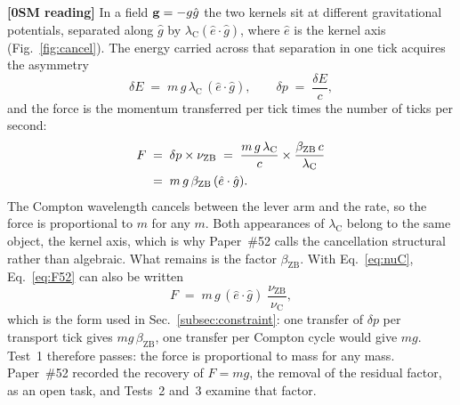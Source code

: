 \documentclass[%
 reprint, amsmath,amssymb, aps, prb, ]{revtex4-2}
\numberwithin{equation}{section}
\newcommand{\betaZB}{\beta_{\text{ZB}}}
\newcommand{\lambdaC}{\lambda_{\text{C}}}
\newcommand{\nuZB}{\nu_{\text{ZB}}}
\newcommand{\nuC}{\nu_{\text{C}}}
\begin{document}
\textbf{[0SM reading]} In a field $\vb{g} = -g\hat{g}$ the two kernels sit at different gravitational potentials, separated along $\hat{g}$ by $\lambdaC(\hat{e}\cdot\hat{g})$, where $\hat{e}$ is the kernel axis (Fig.~\ref{fig:cancel}). The energy carried across that separation in one tick acquires the asymmetry
\begin{equation}
\delta E \;=\; m\,g\,\lambdaC\,(\hat{e}\cdot\hat{g}),
\qquad
\delta p \;=\; \frac{\delta E}{c},
\label{eq:dE52}
\end{equation}
and the force is the momentum transferred per tick times the number of ticks per second:
\begin{align}
F
&\;=\; \delta p \times \nuZB
\;=\; \frac{m\,g\,\lambdaC}{c}\times\frac{\betaZB\,c}{\lambdaC}
\notag\\
&\;=\; m\,g\,\betaZB\,(\hat{e}\cdot\hat{g}) .
\label{eq:F52}
\end{align}
The Compton wavelength cancels between the lever arm and the rate, so the force is proportional to $m$ for any $m$. Both appearances of $\lambdaC$ belong to the same object, the kernel axis, which is why Paper~\#52 calls the cancellation structural rather than algebraic. What remains is the factor $\betaZB$. With Eq.~\eqref{eq:nuC}, Eq.~\eqref{eq:F52} can also be written
\begin{equation}
F \;=\; m\,g\,(\hat{e}\cdot\hat{g})\;\frac{\nuZB}{\nuC},
\label{eq:F52ratio}
\end{equation}
which is the form used in Sec.~\ref{subsec:constraint}: one transfer of $\delta p$ per transport tick gives $mg\,\betaZB$, one transfer per Compton cycle would give $mg$. Test~1 therefore passes: the force is proportional to mass for any mass. Paper~\#52 recorded the recovery of $F = mg$, the removal of the residual factor, as an open task, and Tests~2 and~3 examine that factor.
\end{document}
